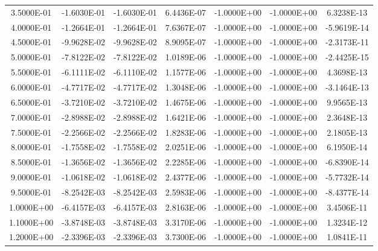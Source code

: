\documentclass[12pt,letterpaper,reqno]{article}
\numberwithin{equation}{section}
\begin{document}
{\begin{tabular}{|c|c|c|c|c|c|c|}
 3.5000E-01     & -1.6030E-01     & -1.6030E-01     &  6.4436E-07     & -1.0000E+00     & -1.0000E+00     &  6.3238E-13    \\ 
 4.0000E-01     & -1.2664E-01     & -1.2664E-01     &  7.6367E-07     & -1.0000E+00     & -1.0000E+00     & -5.9619E-14    \\ 
 4.5000E-01     & -9.9628E-02     & -9.9628E-02     &  8.9095E-07     & -1.0000E+00     & -1.0000E+00     & -2.3173E-11    \\ 
 5.0000E-01     & -7.8122E-02     & -7.8122E-02     &  1.0189E-06     & -1.0000E+00     & -1.0000E+00     & -2.4425E-15    \\ 
 5.5000E-01     & -6.1111E-02     & -6.1110E-02     &  1.1577E-06     & -1.0000E+00     & -1.0000E+00     &  4.3698E-13    \\ 
 6.0000E-01     & -4.7717E-02     & -4.7717E-02     &  1.3048E-06     & -1.0000E+00     & -1.0000E+00     & -3.1464E-13    \\ 
 6.5000E-01     & -3.7210E-02     & -3.7210E-02     &  1.4675E-06     & -1.0000E+00     & -1.0000E+00     &  9.9565E-13    \\ 
 7.0000E-01     & -2.8988E-02     & -2.8988E-02     &  1.6421E-06     & -1.0000E+00     & -1.0000E+00     &  2.3648E-13    \\ 
 7.5000E-01     & -2.2566E-02     & -2.2566E-02     &  1.8283E-06     & -1.0000E+00     & -1.0000E+00     &  2.1805E-13    \\ 
 8.0000E-01     & -1.7558E-02     & -1.7558E-02     &  2.0251E-06     & -1.0000E+00     & -1.0000E+00     &  6.1950E-14    \\ 
 8.5000E-01     & -1.3656E-02     & -1.3656E-02     &  2.2285E-06     & -1.0000E+00     & -1.0000E+00     & -6.8390E-14    \\ 
 9.0000E-01     & -1.0618E-02     & -1.0618E-02     &  2.4377E-06     & -1.0000E+00     & -1.0000E+00     & -5.7732E-14    \\ 
 9.5000E-01     & -8.2542E-03     & -8.2542E-03     &  2.5983E-06     & -1.0000E+00     & -1.0000E+00     & -8.4377E-14    \\ 
 1.0000E+00     & -6.4157E-03     & -6.4157E-03     &  2.8163E-06     & -1.0000E+00     & -1.0000E+00     &  3.4506E-11    \\ 
 1.1000E+00     & -3.8748E-03     & -3.8748E-03     &  3.3170E-06     & -1.0000E+00     & -1.0000E+00     &  1.3234E-12    \\ 
 1.2000E+00     & -2.3396E-03     & -2.3396E-03     &  3.7300E-06     & -1.0000E+00     & -1.0000E+00     &  1.0841E-11    \\ 

\end{tabular}}
\end{document}

